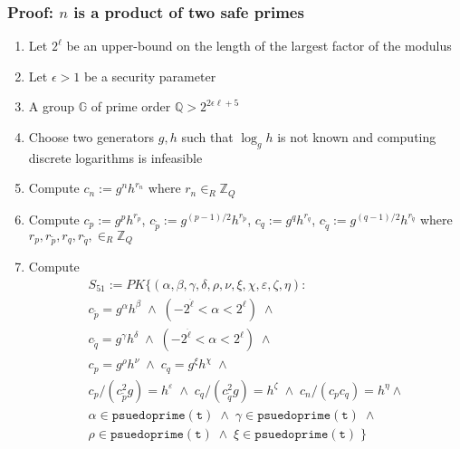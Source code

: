 \subsubsection{Proof: $n$ is a product of two safe primes}
\begin{enumerate}
    \item Let $2^\ell$ be an upper-bound on the length of the largest factor of the modulus
    \item Let $\epsilon > 1$ be a security parameter
    \item A group $\mathbb{G}$ of prime order $\mathbb{Q} > 2^{2\epsilon\ell+5}$
    \item Choose two generators $g, h$ such that  $\log_gh$ is not known and computing discrete logarithms is infeasible
    \item Compute $c_n := g^nh^{r_n}$ where $r_n \in_R \mathbb{Z}_Q$
    \item Compute $c_p := g^ph^{r_p}$, $c_{\tilde{p}}:= g^{(p-1)/2}h^{r_{\tilde{p}}}$, $c_q := g^qh^{r_q}$, $c_{\tilde{q}}:= g^{(q-1)/2}h^{r_{\tilde{q}}}$ where $r_p,r_{\tilde{p}},r_q,r_{\tilde{q}}, \in_R \mathbb{Z}_Q$
    \item Compute
    \begin{align}
        S_{51} := PK\{(\alpha,\beta,\gamma,\delta,\rho,\nu,\xi,\chi,\varepsilon,\zeta,\eta):\\
        c_{\tilde{p}} = g^{\alpha}h^{\beta} \; \land \; (-2^{\ddot{\ell}} < \alpha < 2^{\ell}) \; \land \\
        c_{\tilde{q}} = g^{\gamma}h^{\delta} \; \land \; (-2^{\ddot{\ell}} < \alpha < 2^{\ell}) \; \land \\
        c_p = g^{\rho}h^{\nu} \; \land \; c_q = g^{\xi}h^{\chi} \; \land \\
        c_p/(c_{\tilde{p}}^2g) = h^{\varepsilon} \; \land \; c_q/(c_{\tilde{q}}^2g) = h^{\zeta} \; \land \; c_n/(c_p c_q) = h^{\eta} \land \\
        \alpha \in \mathtt{psuedoprime(t)} \; \land \; \gamma \in \mathtt{psuedoprime(t)} \; \land \\
        \rho \in \mathtt{psuedoprime(t)} \; \land \; \xi \in \mathtt{psuedoprime(t)} \;
        \}
    \end{align}
\end{enumerate}

